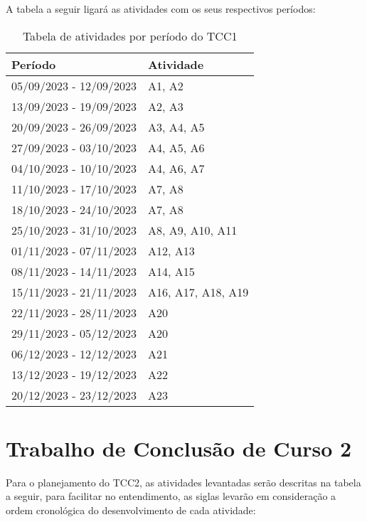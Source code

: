\pagebreak

A tabela a seguir ligará as atividades com os seus respectivos períodos:

\pagebreak

\begin{table}[!ht]
\centering
\begin{tabularx}{\textwidth}{|X|X|}
\hline
\textbf{Período} & \textbf{Atividade} \\
\hline
05/09/2023 - 12/09/2023 & A1, A2 \\ \hline
13/09/2023 - 19/09/2023 & A2, A3 \\ \hline
20/09/2023 - 26/09/2023 & A3, A4, A5 \\ \hline
27/09/2023 - 03/10/2023 & A4, A5, A6 \\ \hline
04/10/2023 - 10/10/2023 & A4, A6, A7 \\ \hline
11/10/2023 - 17/10/2023 & A7, A8 \\ \hline
18/10/2023 - 24/10/2023 & A7, A8 \\ \hline
25/10/2023 - 31/10/2023 & A8, A9, A10, A11 \\ \hline
01/11/2023 - 07/11/2023 & A12, A13 \\ \hline
08/11/2023 - 14/11/2023 & A14, A15 \\ \hline
15/11/2023 - 21/11/2023 & A16, A17, A18, A19 \\ \hline
22/11/2023 - 28/11/2023 & A20 \\ \hline
29/11/2023 - 05/12/2023 & A20 \\ \hline
06/12/2023 - 12/12/2023 & A21 \\ \hline
13/12/2023 - 19/12/2023 & A22 \\ \hline
20/12/2023 - 23/12/2023 & A23 \\ \hline
\end{tabularx}
\caption{Tabela de atividades por período do TCC1}
\end{table}

\section{Trabalho de Conclusão de Curso 2}

Para o planejamento do TCC2, as atividades levantadas serão descritas na tabela a seguir, para facilitar no entendimento, as siglas levarão em consideração a ordem cronológica do desenvolvimento de cada atividade:

